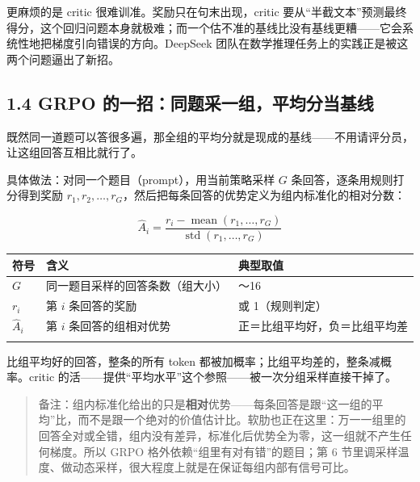 \documentclass[
  chinese,
]{ctexart}
\begin{document}
更麻烦的是 critic 很难训准。奖励只在句末出现，critic
要从``半截文本''预测最终得分，这个回归问题本身就极难；而一个估不准的基线比没有基线更糟------它会系统性地把梯度引向错误的方向。DeepSeek
团队在数学推理任务上的实践正是被这两个问题逼出了新招。

\subsection{1.4 GRPO
的一招：同题采一组，平均分当基线}\label{grpo-ux7684ux4e00ux62dbux540cux9898ux91c7ux4e00ux7ec4ux5e73ux5747ux5206ux5f53ux57faux7ebf}

既然同一道题可以答很多遍，那全组的平均分就是现成的基线------不用请评分员，让这组回答互相比就行了。

具体做法：对同一个题目（prompt），用当前策略采样 \(G\)
条回答，逐条用规则打分得到奖励
\(r_1, r_2, \ldots, r_G\)，然后把每条回答的优势定义为组内标准化的相对分数：

\[
\hat{A}_i = \frac{r_i - \operatorname{mean}(r_1, \ldots, r_G)}{\operatorname{std}(r_1, \ldots, r_G)}
\]

\begin{center}
\begin{tabular}{@{}>{\raggedright\arraybackslash}p{} >{\raggedright\arraybackslash}p{} >{\raggedright\arraybackslash}p{}@{}}
\toprule\noalign{}
符号 & 含义 & 典型取值 \\
\midrule\noalign{}
\(G\) & 同一题目采样的回答条数（组大小） & 4～16 \\
\(r_i\) & 第 \(i\) 条回答的奖励 & 0 或 1（规则判定） \\
\(\hat{A}_i\) & 第 \(i\) 条回答的组相对优势 & 正＝比组平均好，负＝比组平均差 \\
\bottomrule\noalign{}
\end{tabular}
\end{center}

比组平均好的回答，整条的所有 token
都被加概率；比组平均差的，整条减概率。critic
的活------提供``平均水平''这个参照------被一次分组采样直接干掉了。

\begin{quote}
备注：组内标准化给出的只是\textbf{相对}优势------每条回答是跟``这一组的平均''比，而不是跟一个绝对的价值估计比。软肋也正在这里：万一一组里的回答全对或全错，组内没有差异，标准化后优势全为零，这一组就不产生任何梯度。所以
GRPO 格外依赖``组里有对有错''的题目；第 6
节里调采样温度、做动态采样，很大程度上就是在保证每组内部有信号可比。
\end{quote}
\end{document}
